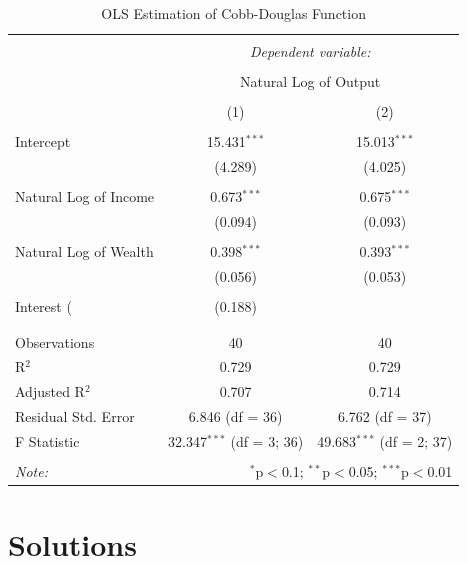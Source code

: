 \documentclass[
]{book}
\theoremstyle{definition}
\theoremstyle{definition}
\theoremstyle{definition}
\theoremstyle{definition}
\theoremstyle{remark}
\begin{document}
\begin{table}[!htbp] \centering 
  \caption{OLS Estimation of Cobb-Douglas Function} 
  \label{} 
\begin{tabular}{@{\extracolsep{5pt}}lcc} 
\\[-1.8ex]\hline 
\hline \\[-1.8ex] 
 & \multicolumn{2}{c}{\textit{Dependent variable:}} \\ 
\cline{2-3} 
\\[-1.8ex] & \multicolumn{2}{c}{Natural Log of Output} \\ 
\\[-1.8ex] & (1) & (2)\\ 
\hline \\[-1.8ex] 
 Intercept & 15.431$^{***}$ & 15.013$^{***}$ \\ 
  & (4.289) & (4.025) \\ 
  & & \\ 
 Natural Log of Income & 0.673$^{***}$ & 0.675$^{***}$ \\ 
  & (0.094) & (0.093) \\ 
  & & \\ 
 Natural Log of Wealth & 0.398$^{***}$ & 0.393$^{***}$ \\ 
  & (0.056) & (0.053) \\ 
  & & \\ 
 Interest (%
  & (0.188) &  \\ 
  & & \\ 
\hline \\[-1.8ex] 
Observations & 40 & 40 \\ 
R$^{2}$ & 0.729 & 0.729 \\ 
Adjusted R$^{2}$ & 0.707 & 0.714 \\ 
Residual Std. Error & 6.846 (df = 36) & 6.762 (df = 37) \\ 
F Statistic & 32.347$^{***}$ (df = 3; 36) & 49.683$^{***}$ (df = 2; 37) \\ 
\hline 
\hline \\[-1.8ex] 
\textit{Note:}  & \multicolumn{2}{r}{$^{*}$p$<$0.1; $^{**}$p$<$0.05; $^{***}$p$<$0.01} \\ 
\end{tabular} 
\end{table}

\hypertarget{solutions-3}{%
\section*{Solutions}\label{solutions-3}}
\end{document}
